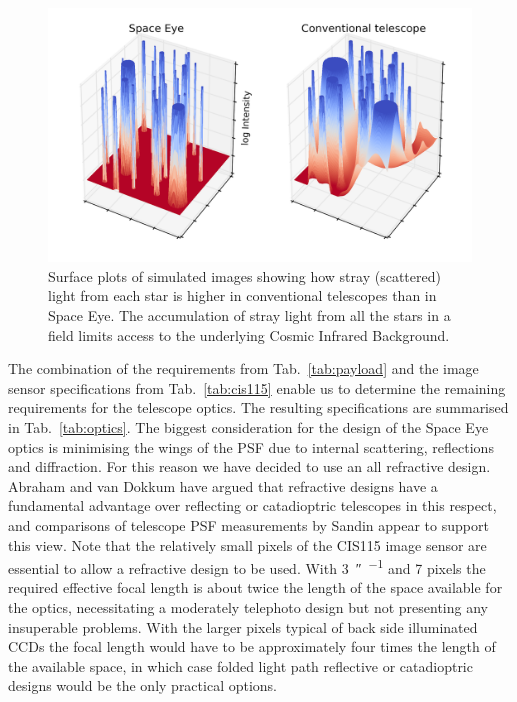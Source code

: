 \documentclass[]{iac}
\begin{document}
\begin{figure}[tp]
  \includegraphics[width=\columnwidth]{figures/wings.png}
  \caption{\label{fig:wings}Surface plots of simulated images showing how stray (scattered) light from each star is
    higher in conventional telescopes than in Space Eye. The accumulation of stray light from all the stars in a field
    limits access to the underlying Cosmic Infrared Background.}
\end{figure}

The combination of the requirements from Tab.~\ref{tab:payload} and the image sensor specifications from
Tab.~\ref{tab:cis115} enable us to determine the remaining requirements for the telescope optics. The resulting
specifications are summarised in Tab.~\ref{tab:optics}. The biggest consideration for the design of the Space Eye optics
is minimising the wings of the PSF due to internal scattering, reflections and diffraction. For this reason we have
decided to use an all refractive design. Abraham and van Dokkum\cite{Abraham2014} have argued that refractive designs
have a fundamental advantage over reflecting or catadioptric telescopes in this respect, and comparisons of telescope
PSF measurements by Sandin\cite{Sandin2014} appear to support this view. Note that the relatively small pixels of the
CIS115 image sensor are essential to allow a refractive design to be used. With \SI{3}{\arcsecond\per\pix} and
\SI{7}{\micron} pixels the required effective focal length is about twice the length of the space available for the
optics, necessitating a moderately telephoto design but not presenting any insuperable problems. With the larger pixels
typical of back side illuminated CCDs the focal length would have to be approximately four times the length of the
available space, in which case folded light path reflective or catadioptric designs would be the only practical options.
\end{document}
